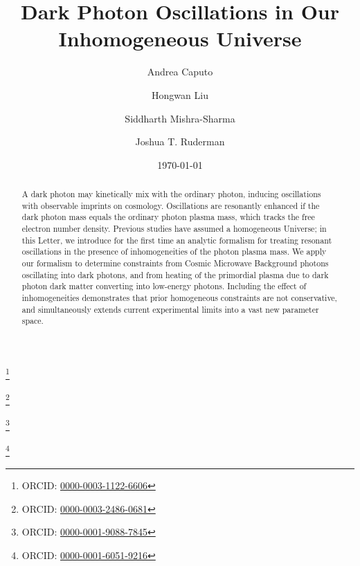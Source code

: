 \documentclass[prd,aps,10pt,nofootinbib,twocolumn,superscriptaddress,preprintnumbers,balancelastpage,longbibliography]{revtex4-1}
\begin{document}
\title{Dark Photon Oscillations in Our Inhomogeneous Universe}

\author{Andrea Caputo}
\thanks{ORCID: \href{https://orcid.org/0000-0003-1122-6606}{0000-0003-1122-6606}}

\author{Hongwan Liu}
\thanks{ORCID: \href{https://orcid.org/0000-0003-2486-0681}{0000-0003-2486-0681}}

\author{Siddharth Mishra-Sharma}
\thanks{ORCID: \href{https://orcid.org/0000-0001-9088-7845}{0000-0001-9088-7845}}

\author{Joshua T. Ruderman}
\thanks{ORCID: \href{https://orcid.org/0000-0001-6051-9216}{0000-0001-6051-9216}}

\date{\protect\today}

\begin{abstract}
A dark photon may kinetically mix with the ordinary photon, inducing oscillations with observable imprints on cosmology.  Oscillations are resonantly enhanced if the dark photon mass equals the ordinary photon plasma mass, which tracks the free electron number density.  Previous studies have assumed a homogeneous Universe; in this Letter, we introduce for the first time an analytic formalism for treating resonant oscillations in the presence of inhomogeneities of the photon plasma mass.  We apply our formalism to determine constraints from Cosmic Microwave Background photons oscillating into dark photons, and from heating of the primordial plasma due to dark photon dark matter converting into low-energy photons. Including the effect of inhomogeneities demonstrates that prior homogeneous constraints are not conservative, and simultaneously extends current experimental limits into a vast new parameter space. \githubmaster
\end{abstract}

\maketitle
\end{document}
